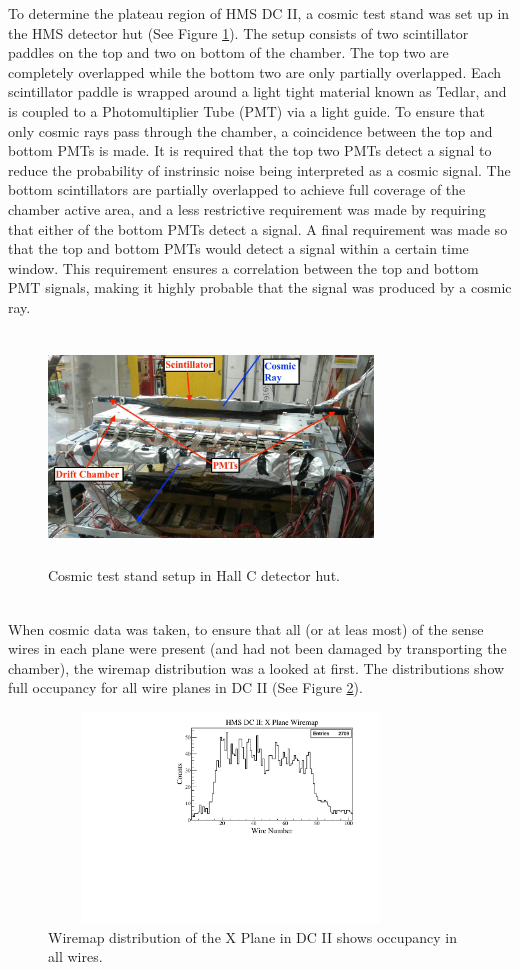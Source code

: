 \documentclass[letterpaper, 10 pt, conference]{ieeeconf}  %
\begin{document}
\indent To determine the plateau region of HMS DC II,  a cosmic test stand was set up in the HMS detector hut (See Figure \ref{fig:cosmic_stand}). The setup consists of two scintillator paddles on the top
and two on bottom of the chamber. The top two are completely overlapped while the bottom two are only partially overlapped. Each scintillator paddle is wrapped around a light tight material known as Tedlar,
and is coupled to a Photomultiplier Tube (PMT) via a light guide. To ensure that only cosmic rays pass through the chamber, a coincidence between the top and bottom PMTs is made. It is required that the top
two PMTs detect a signal to reduce the probability of instrinsic noise being interpreted as a cosmic signal. The bottom scintillators are partially overlapped to achieve full coverage of the chamber active
area, and a less restrictive requirement was made by requiring that either of the bottom PMTs detect a signal. A final requirement was made so that the top and bottom PMTs would detect a signal within a
certain time window. This requirement ensures a correlation between the top and bottom PMT signals, making it highly probable that the signal was produced by a cosmic ray. 
\begin{figure}[h!]
  \centering
  \includegraphics[width=3.4in, height=2.4in]{dc2_tests/dc2_teststand_03.jpg}
  \caption{Cosmic test stand setup in Hall C detector hut.}
  \label{fig:cosmic_stand}
\end{figure} \\
When cosmic data was taken, to ensure that all (or at leas most) of the sense wires in each plane were present (and had not been damaged by transporting the chamber), the wiremap distribution was
a looked at first. The distributions show full occupancy for all wire planes in DC II (See Figure \ref{fig:hdc2_wiremap}).  
\begin{figure}[h!]
  \centering
  \includegraphics[width=3.8in, height=2.2in]{dc2_tests/hdc2_xmap.pdf}
  \caption{Wiremap distribution of the X Plane in DC II shows occupancy in all wires.}
  \label{fig:hdc2_wiremap}
\end{figure} \\
\end{document}
